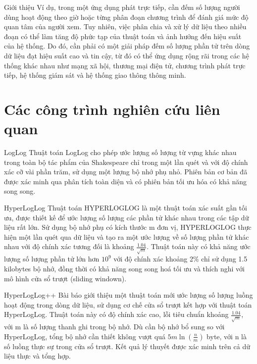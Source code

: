 \documentclass[10pt]{beamer}
\begin{document}
\begin{frame}[fragile]{Giới thiệu}
Ví dụ, trong một ứng dụng phát trực tiếp, cần đếm số lượng người dùng hoạt động theo giờ hoặc từng phân
đoạn chương trình để đánh giá mức độ quan tâm của người xem. Tuy nhiên, việc phân chia và xử lý dữ liệu
theo nhiều đoạn có thể làm tăng độ phức tạp của thuật toán và ảnh hưởng đến hiệu suất của hệ thống. Do
đó, cần phải có một giải pháp đếm số lượng phần tử trên dòng dữ liệu đạt hiệu suất cao và tin cậy, từ đó
có thể ứng dụng rộng rãi trong các hệ thống khác nhau như mạng xã hội, thương mại điện tử, chương trình
phát trực tiếp, hệ thống giám sát và hệ thống giao thông thông minh.
\end{frame}
\section{Các công trình nghiên cứu liên quan}
\begin{frame}[fragile]{LogLog \cite{durand2003loglog}}
  Thuật toán LogLog cho phép ước lượng số lượng từ vựng khác nhau trong toàn bộ tác phẩm
  của Shakespeare chỉ trong một lần quét và với độ chính xác cỡ vài phần trăm, sử dụng một lượng bộ nhớ
  phụ nhỏ. Phiên bản cơ bản đã được xác minh qua phân tích toàn diện và có phiên bản tối ưu hóa có khả
  năng song song.
\end{frame}
\begin{frame}[fragile]{HyperLogLog \cite{flajolet2007hyperloglog}}
  Thuật toán HYPERLOGLOG là một thuật toán xác suất gần tối ưu, được thiết kế để ước lượng số lượng các phần tử khác nhau trong các tập dữ liệu rất lớn. 
  Sử dụng bộ nhớ phụ có kích thước m đơn vị, HYPERLOGLOG thực hiện một lần quét qua dữ liệu và tạo ra một ước lượng về số lượng phần tử khác nhau với độ chính xác tương đối là khoảng $\frac{1.04}{\sqrt{m}}$. 
  Thuật toán này có khả năng ước lượng số lượng phần tử lớn hơn $10^9$ với độ chính xác khoảng 2\% chỉ sử dụng 1.5 kilobytes bộ nhớ, đồng thời có khả năng song song hoá tối ưu 
  và thích nghi với mô hình cửa sổ trượt (sliding windown).
\end{frame}
\begin{frame}[fragile]{HyperLogLog++ \cite{heule2013hyperloglog}}
  Bài báo giới thiệu một thuật toán mới ước lượng số lượng luồng hoạt động trong dòng dữ liệu, sử dụng cơ chế cửa sổ trượt kết hợp với 
  thuật toán HyperLogLog. Thuật toán này có độ chính xác cao, lỗi tiêu chuẩn khoảng $\frac{1.04}{\sqrt{m}}$, với m là số lượng thanh ghi trong bộ nhớ. Dù cần bộ nhớ bổ sung 
  so với HyperLogLog, tổng bộ nhớ cần thiết không vượt quá $5m\ln(\frac{n}{m})$ byte, với n là số luồng thực sự trong cửa sổ trượt. Kết quả lý thuyết được xác minh trên cả dữ liệu thực 
  và tổng hợp.
\end{frame}
\end{document}
